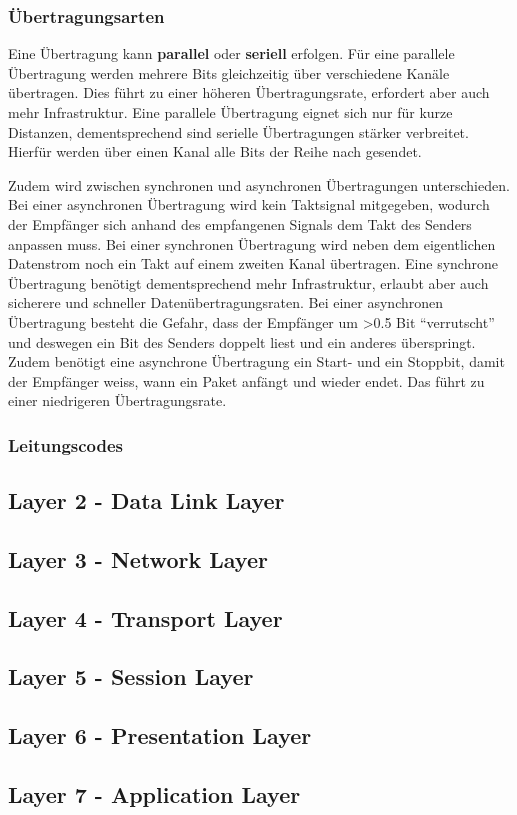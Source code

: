 \documentclass{article}
\begin{document}
\subsubsection{Übertragungsarten}
Eine Übertragung kann \textbf{parallel} oder \textbf{seriell} erfolgen. Für eine parallele Übertragung werden mehrere Bits gleichzeitig über verschiedene Kanäle übertragen. Dies führt zu einer höheren Übertragungsrate, erfordert aber auch mehr Infrastruktur. Eine parallele Übertragung eignet sich nur für kurze Distanzen, dementsprechend sind serielle Übertragungen stärker verbreitet. Hierfür werden über einen Kanal alle Bits der Reihe nach gesendet.

Zudem wird zwischen synchronen und asynchronen Übertragungen unterschieden. Bei einer asynchronen Übertragung wird kein Taktsignal mitgegeben, wodurch der Empfänger sich anhand des empfangenen Signals dem Takt des Senders anpassen muss. Bei einer synchronen Übertragung wird neben dem eigentlichen Datenstrom noch ein Takt auf einem zweiten Kanal übertragen. Eine synchrone Übertragung benötigt dementsprechend mehr Infrastruktur, erlaubt aber auch sicherere und schneller Datenübertragungsraten. Bei einer asynchronen Übertragung besteht die Gefahr, dass der Empfänger um >0.5 Bit ``verrutscht'' und deswegen ein Bit des Senders doppelt liest und ein anderes überspringt. Zudem benötigt eine asynchrone Übertragung ein Start- und ein Stoppbit, damit der Empfänger weiss, wann ein Paket anfängt und wieder endet. Das führt zu einer niedrigeren Übertragungsrate.

\subsubsection{Leitungscodes}
\subsection{Layer 2 - Data Link Layer}
\subsection{Layer 3 - Network Layer}
\subsection{Layer 4 - Transport Layer}
\subsection{Layer 5 - Session Layer}
\subsection{Layer 6 - Presentation Layer}
\subsection{Layer 7 - Application Layer}
\end{document}
